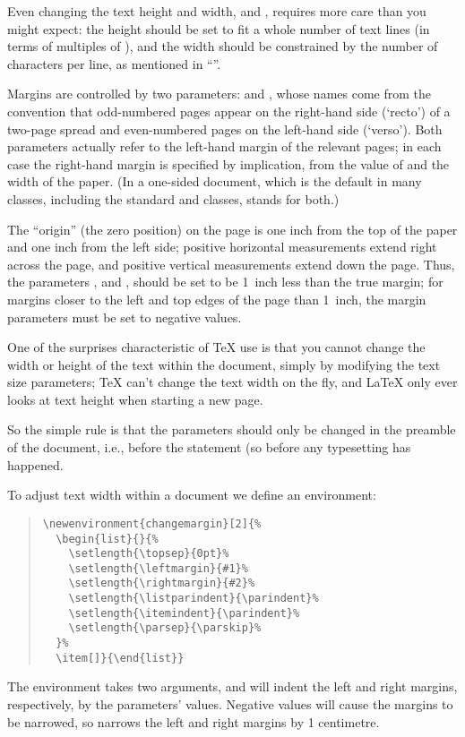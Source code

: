 Even changing the text height and width,  and
, requires more care than you might expect: the height
should be set to fit a whole number of text lines (in terms of
multiples of ), and the width should be constrained
by the number of characters per line, as mentioned in %
``''.

Margins are controlled by two parameters:  and
, whose names come from the convention that
odd-numbered pages appear on the right-hand side (`recto') of a
two-page spread and even-numbered pages on the left-hand side
(`verso').  Both parameters actually refer to the left-hand margin of
the relevant pages; in each case the right-hand margin is specified by
implication, from the value of  and the width of the
paper.  (In a one-sided document, which is the default in many
classes, including the standard  and 
classes,  stands for both.)

The
``origin'' (the zero position) on the page is one inch from the top of
the paper and one inch from the left side; positive horizontal
measurements extend right across the page, and positive vertical
measurements extend down the page. Thus, the parameters
,  and , should
be set to be 1~inch less than the true margin; for margins closer to
the left and top edges of the page than 1~inch, the margin parameters
must be set to negative values.


One of the surprises characteristic of \TeX{} use is that you cannot
change the width or height of the text within the document, simply by
modifying the text size parameters; \TeX{} can't change the text width
on the fly, and \LaTeX{} only ever looks at text height when starting
a new page.

So the simple rule is that the parameters should only be
changed in the preamble of the document, i.e., before the
 statement (so before any typesetting has
happened.

To adjust text width within a document we define an environment:
\begin{quote}
\begin{verbatim}
\newenvironment{changemargin}[2]{%
  \begin{list}{}{%
    \setlength{\topsep}{0pt}%
    \setlength{\leftmargin}{#1}%
    \setlength{\rightmargin}{#2}%
    \setlength{\listparindent}{\parindent}%
    \setlength{\itemindent}{\parindent}%
    \setlength{\parsep}{\parskip}%
  }%
  \item[]}{\end{list}}
\end{verbatim}
\end{quote}
The environment takes two arguments, and will indent the left and
right margins, respectively, by the parameters' values. Negative
values will cause the margins to be narrowed, so
 narrows the left and right
margins by 1 centimetre.

